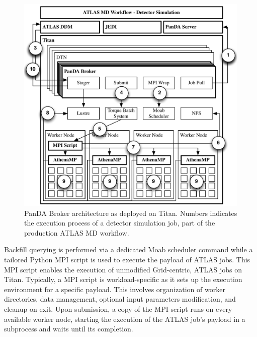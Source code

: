 
\begin{figure}
  \begin{center}
    \includegraphics[width=\columnwidth]{figures/panda_broker_architecture.pdf}
    \caption{PanDA Broker architecture as deployed on Titan. Numbers indicates
    the execution process of a detector simulation job, part of the production
    ATLAS MD workflow.}
  \end{center}
\label{fig:panda_broker}
\end{figure}

Backfill querying is performed via a dedicated Moab scheduler command while a
tailored Python MPI script is used to execute the payload of ATLAS jobs. This
MPI script enables the execution of unmodified Grid-centric, ATLAS jobs on
Titan. Typically, a MPI script is workload-specific as it sets up the execution
environment for a specific payload. This involves organization of worker
directories, data management, optional input parameters modification, and
cleanup on exit. Upon submission, a copy of the MPI script runs on every
available worker node,
starting the execution of the ATLAS job's payload in a subprocess and waits
until its completion.

